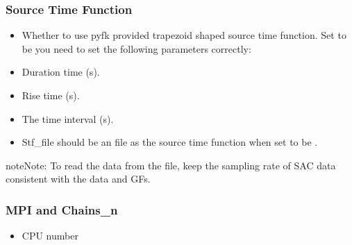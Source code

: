 \documentclass[a4paper,10pt,english,openany]{sphinxmanual}
\begin{document}
\subsubsection{Source Time Function}
\label{\detokenize{tutorials/S4_Inv_DC:source-time-function}}
\begin{itemize}
\item {} 
Whether to use pyfk provided trapezoid shaped source time function. Set to be  you need to set the following parameters correctly:


\end{itemize}

\begin{itemize}
\item {} 
Duration time (s).

\end{itemize}

\begin{itemize}
\item {} 
Rise time (s).

\end{itemize}

\begin{itemize}
\item {} 
The time interval (s).

\end{itemize}

\begin{itemize}
\item {} 
Stf\_file should be an  file as the source time function when set  to be .

\end{itemize}

\begin{sphinxadmonition}{note}{Note:}
To read the data from the  file, keep the sampling rate of SAC data consistent with the data and GFs.
\end{sphinxadmonition}


\subsubsection{MPI and Chains\_n}
\label{\detokenize{tutorials/S4_Inv_DC:mpi-and-chains-n}}
\begin{itemize}
\item {} 
CPU number

\end{itemize}
\end{document}
